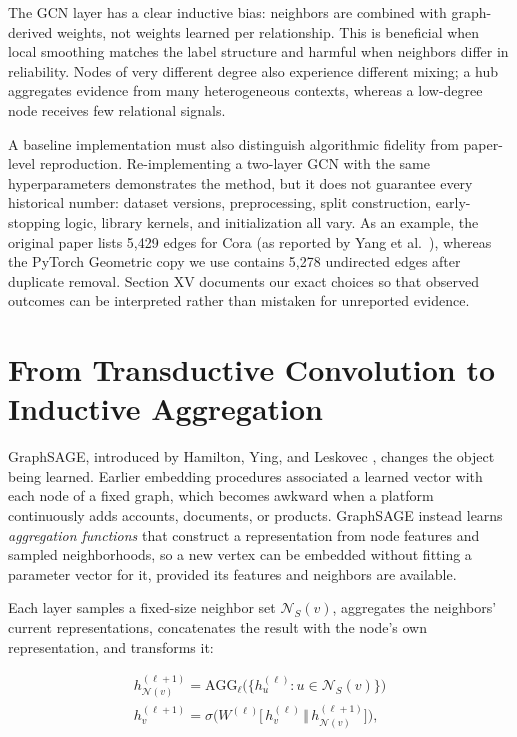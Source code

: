 \documentclass[conference]{IEEEtran}
\begin{document}
The GCN layer has a clear inductive bias: neighbors are combined with graph-derived weights, not weights learned per relationship. This is beneficial when local smoothing matches the label structure and harmful when neighbors differ in reliability. Nodes of very different degree also experience different mixing; a hub aggregates evidence from many heterogeneous contexts, whereas a low-degree node receives few relational signals.

A baseline implementation must also distinguish algorithmic fidelity from paper-level reproduction. Re-implementing a two-layer GCN with the same hyperparameters demonstrates the method, but it does not guarantee every historical number: dataset versions, preprocessing, split construction, early-stopping logic, library kernels, and initialization all vary. As an example, the original paper lists 5,429 edges for Cora (as reported by Yang et al.~\cite{b12}), whereas the PyTorch Geometric copy we use contains 5,278 undirected edges after duplicate removal. Section XV documents our exact choices so that observed outcomes can be interpreted rather than mistaken for unreported evidence.

\section{From Transductive Convolution to Inductive Aggregation}

GraphSAGE, introduced by Hamilton, Ying, and Leskovec \cite{b2}, changes the object being learned. Earlier embedding procedures associated a learned vector with each node of a fixed graph, which becomes awkward when a platform continuously adds accounts, documents, or products. GraphSAGE instead learns \emph{aggregation functions} that construct a representation from node features and sampled neighborhoods, so a new vertex can be embedded without fitting a parameter vector for it, provided its features and neighbors are available.

Each layer samples a fixed-size neighbor set \(\mathcal{N}_S(v)\), aggregates the neighbors' current representations, concatenates the result with the node's own representation, and transforms it:

\[\begin{gathered}h_{\mathcal{N}(v)}^{(\ell+1)} = \mathrm{AGG}_\ell\big(\{h_u^{(\ell)} : u\in\mathcal{N}_S(v)\}\big) \\ h_v^{(\ell+1)} = \sigma\Big(W^{(\ell)}\big[\,h_v^{(\ell)} \,\Vert\, h_{\mathcal{N}(v)}^{(\ell+1)}\big]\Big),\end{gathered}\tag{6}\]
\end{document}
